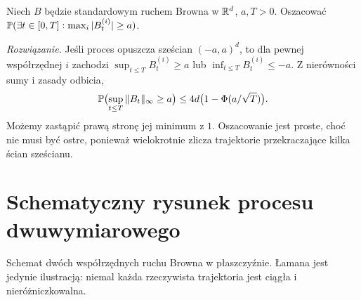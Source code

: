 \begin{zadanie}
Niech $B$ będzie standardowym ruchem Browna w $\mathbb{R}^d$, $a,T>0$.
Oszacować $\mathbb{P}(\exists t\in[0,T]:\max_i|B_t^{(i)}|\ge a)$.

\emph{Rozwiązanie.} Jeśli proces opuszcza sześcian $(-a,a)^d$,
to dla pewnej współrzędnej $i$ zachodzi
$\sup_{t\le T} B_t^{(i)}\ge a$ lub
$\inf_{t\le T} B_t^{(i)}\le-a$.
Z nierówności sumy i zasady odbicia,
\[
\mathbb{P}\bigl(\sup_{t\le T}\|B_t\|_\infty\ge a\bigr)
\le4d\bigl(1-\Phi(a/\sqrt T)\bigr).
\]
Możemy zastąpić prawą stronę jej minimum z $1$.
Oszacowanie jest proste, choć nie musi być ostre,
ponieważ wielokrotnie zlicza trajektorie przekraczające
kilka ścian sześcianu.
\end{zadanie}

\section{Schematyczny rysunek procesu dwuwymiarowego}
\begin{center}
\par\smallskip\small Schemat dwóch współrzędnych ruchu Browna w płaszczyźnie.
Łamana jest jedynie ilustracją: niemal każda rzeczywista trajektoria
jest ciągła i nieróżniczkowalna.
\end{center}


